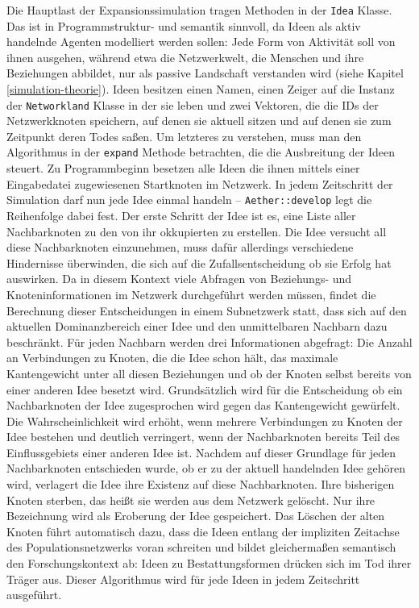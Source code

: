 \documentclass[openany,twoside,twocolumn]{book}
\begin{document}
Die Hauptlast der Expansionssimulation tragen Methoden in der \texttt{Idea} Klasse. Das ist in Programmstruktur- und semantik sinnvoll, da Ideen als aktiv handelnde Agenten modelliert werden sollen: Jede Form von Aktivität soll von ihnen ausgehen, während etwa die Netzwerkwelt, die Menschen und ihre Beziehungen abbildet, nur als passive Landschaft verstanden wird (siehe Kapitel \ref{simulation-theorie}). Ideen besitzen einen Namen, einen Zeiger auf die Instanz der \texttt{Networkland} Klasse in der sie leben und zwei Vektoren, die die IDs der Netzwerkknoten speichern, auf denen sie aktuell sitzen und auf denen sie zum Zeitpunkt deren Todes saßen. Um letzteres zu verstehen, muss man den Algorithmus in der \texttt{expand} Methode betrachten, die die Ausbreitung der Ideen steuert. Zu Programmbeginn besetzen alle Ideen die ihnen mittels einer Eingabedatei zugewiesenen Startknoten im Netzwerk. In jedem Zeitschritt der Simulation darf nun jede Idee einmal handeln -- \texttt{Aether::develop} legt die Reihenfolge dabei fest. Der erste Schritt der Idee ist es, eine Liste aller Nachbarknoten zu den von ihr okkupierten zu erstellen. Die Idee versucht all diese Nachbarknoten einzunehmen, muss dafür allerdings verschiedene Hindernisse überwinden, die sich auf die Zufallsentscheidung ob sie Erfolg hat auswirken. Da in diesem Kontext viele Abfragen von Beziehungs- und Knoteninformationen im Netzwerk durchgeführt werden müssen, findet die Berechnung dieser Entscheidungen in einem Subnetzwerk statt, dass sich auf den aktuellen Dominanzbereich einer Idee und den unmittelbaren Nachbarn dazu beschränkt. Für jeden Nachbarn werden drei Informationen abgefragt: Die Anzahl an Verbindungen zu Knoten, die die Idee schon hält, das maximale Kantengewicht unter all diesen Beziehungen und ob der Knoten selbst bereits von einer anderen Idee besetzt wird. Grundsätzlich wird für die Entscheidung ob ein Nachbarknoten der Idee zugesprochen wird gegen das Kantengewicht gewürfelt. Die Wahrscheinlichkeit wird erhöht, wenn mehrere Verbindungen zu Knoten der Idee bestehen und deutlich verringert, wenn der Nachbarknoten bereits Teil des Einflussgebiets einer anderen Idee ist. Nachdem auf dieser Grundlage für jeden Nachbarknoten entschieden wurde, ob er zu der aktuell handelnden Idee gehören wird, verlagert die Idee ihre Existenz auf diese Nachbarknoten. Ihre bisherigen Knoten sterben, das heißt sie werden aus dem Netzwerk gelöscht. Nur ihre Bezeichnung wird als Eroberung der Idee gespeichert. Das Löschen der alten Knoten führt automatisch dazu, dass die Ideen entlang der impliziten Zeitachse des Populationsnetzwerks voran schreiten und bildet gleichermaßen semantisch den Forschungskontext ab: Ideen zu Bestattungsformen drücken sich im Tod ihrer Träger aus. Dieser Algorithmus wird für jede Ideen in jedem Zeitschritt ausgeführt.
\end{document}
